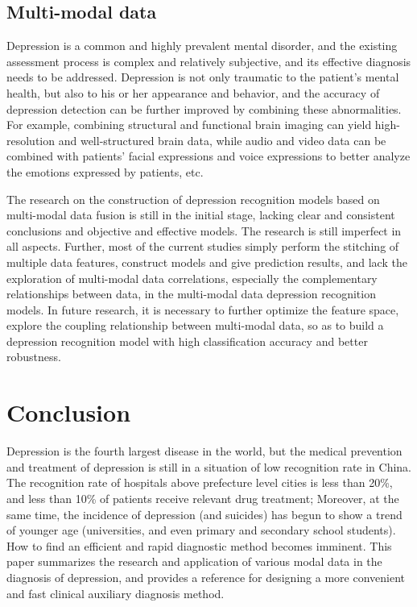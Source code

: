 \subsection{Multi-modal data}
Depression is a common and highly prevalent mental disorder, and the existing assessment process is complex and relatively subjective, and its effective diagnosis needs to be addressed. Depression is not only traumatic to the patient's mental health, but also to his or her appearance and behavior, and the accuracy of depression detection can be further improved by combining these abnormalities. For example, combining structural and functional brain imaging can yield high-resolution and well-structured brain data, while audio and video data can be combined with patients' facial expressions and voice expressions to better analyze the emotions expressed by patients, etc.

The research on the construction of depression recognition models based on multi-modal data fusion is still in the initial stage, lacking clear and consistent conclusions and objective and effective models.
The research is still imperfect in all aspects.
Further, most of the current studies simply perform the stitching of multiple data features, construct models and give prediction results, and lack the exploration of multi-modal data correlations, especially the complementary relationships between data, in the multi-modal data depression recognition models.
In future research, it is necessary to further optimize the feature space, explore the coupling relationship between multi-modal data, so as to build a depression recognition model with high classification accuracy and better robustness.





\section{Conclusion}
Depression is the fourth largest disease in the world, but the medical prevention and treatment of depression is still in a situation of low recognition rate in China. The recognition rate of hospitals above prefecture level cities is less than 20\%, and less than 10\% of patients receive relevant drug treatment; Moreover, at the same time, the incidence of depression (and suicides) has begun to show a trend of younger age (universities, and even primary and secondary school students). How to find an efficient and rapid diagnostic method becomes imminent. This paper summarizes the research and application of various modal data in the diagnosis of depression, and provides a reference for designing a more convenient and fast clinical auxiliary diagnosis method.

